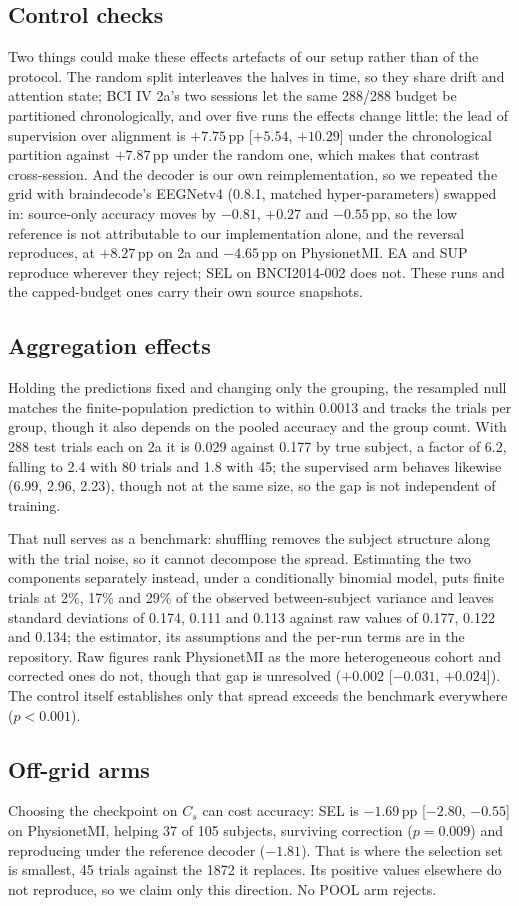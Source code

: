 \subsection{Control checks}
\label{sec:reference}
Two things could make these effects artefacts of our setup rather than of the protocol. The random split interleaves the halves in time, so they share drift and attention state; BCI IV 2a's two sessions let the same 288/288 budget be partitioned chronologically, and over five runs the effects change little: the lead of supervision over alignment is $+7.75$\,pp [$+5.54$, $+10.29$] under the chronological partition against $+7.87$\,pp under the random one, which makes that contrast cross-session. And the decoder is our own reimplementation, so we repeated the grid with braindecode's EEGNetv4 (0.8.1, matched hyper-parameters) swapped in: source-only accuracy moves by $-0.81$, $+0.27$ and $-0.55$\,pp, so the low reference is not attributable to our implementation alone, and the reversal reproduces, at $+8.27$\,pp on 2a and $-4.65$\,pp on PhysionetMI. EA and SUP reproduce wherever they reject; SEL on BNCI2014-002 does not. These runs and the capped-budget ones carry their own source snapshots.

\subsection{Aggregation effects}
Holding the predictions fixed and changing only the grouping, the resampled null matches the finite-population prediction to within 0.0013 and tracks the trials per group, though it also depends on the pooled accuracy and the group count. With 288 test trials each on 2a it is 0.029 against 0.177 by true subject, a factor of 6.2, falling to 2.4 with 80 trials and 1.8 with 45; the supervised arm behaves likewise (6.99, 2.96, 2.23), though not at the same size, so the gap is not independent of training.

That null serves as a benchmark: shuffling removes the subject structure along with the trial noise, so it cannot decompose the spread. Estimating the two components separately instead, under a conditionally binomial model, puts finite trials at 2\%, 17\% and 29\% of the observed between-subject variance and leaves standard deviations of 0.174, 0.111 and 0.113 against raw values of 0.177, 0.122 and 0.134; the estimator, its assumptions and the per-run terms are in the repository. Raw figures rank PhysionetMI as the more heterogeneous cohort and corrected ones do not, though that gap is unresolved ($+0.002$ [$-0.031$, $+0.024$]). The control itself establishes only that spread exceeds the benchmark everywhere ($p < 0.001$).

\subsection{Off-grid arms}
Choosing the checkpoint on $C_s$ can cost accuracy: SEL is $-1.69$\,pp [$-2.80$, $-0.55$] on PhysionetMI, helping 37 of 105 subjects, surviving correction ($p=0.009$) and reproducing under the reference decoder ($-1.81$). That is where the selection set is smallest, 45 trials against the 1872 it replaces. Its positive values elsewhere do not reproduce, so we claim only this direction. No POOL arm rejects.
